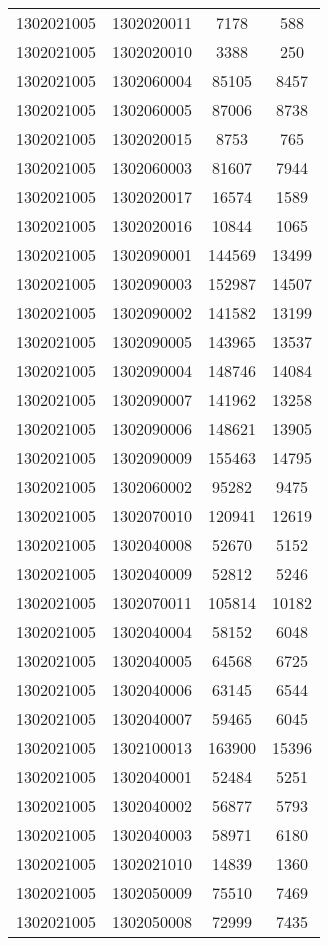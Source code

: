 \begin{longtable}[h]{llcc}
		1302021005 & 1302020011 & 7178 & 588\\
		1302021005 & 1302020010 & 3388 & 250\\
		1302021005 & 1302060004 & 85105 & 8457\\
		1302021005 & 1302060005 & 87006 & 8738\\
		1302021005 & 1302020015 & 8753 & 765\\
		1302021005 & 1302060003 & 81607 & 7944\\
		1302021005 & 1302020017 & 16574 & 1589\\
		1302021005 & 1302020016 & 10844 & 1065\\
		1302021005 & 1302090001 & 144569 & 13499\\
		1302021005 & 1302090003 & 152987 & 14507\\
		1302021005 & 1302090002 & 141582 & 13199\\
		1302021005 & 1302090005 & 143965 & 13537\\
		1302021005 & 1302090004 & 148746 & 14084\\
		1302021005 & 1302090007 & 141962 & 13258\\
		1302021005 & 1302090006 & 148621 & 13905\\
		1302021005 & 1302090009 & 155463 & 14795\\
		1302021005 & 1302060002 & 95282 & 9475\\
		1302021005 & 1302070010 & 120941 & 12619\\
		1302021005 & 1302040008 & 52670 & 5152\\
		1302021005 & 1302040009 & 52812 & 5246\\
		1302021005 & 1302070011 & 105814 & 10182\\
		1302021005 & 1302040004 & 58152 & 6048\\
		1302021005 & 1302040005 & 64568 & 6725\\
		1302021005 & 1302040006 & 63145 & 6544\\
		1302021005 & 1302040007 & 59465 & 6045\\
		1302021005 & 1302100013 & 163900 & 15396\\
		1302021005 & 1302040001 & 52484 & 5251\\
		1302021005 & 1302040002 & 56877 & 5793\\
		1302021005 & 1302040003 & 58971 & 6180\\
		1302021005 & 1302021010 & 14839 & 1360\\
		1302021005 & 1302050009 & 75510 & 7469\\
		1302021005 & 1302050008 & 72999 & 7435\\

\end{longtable}
